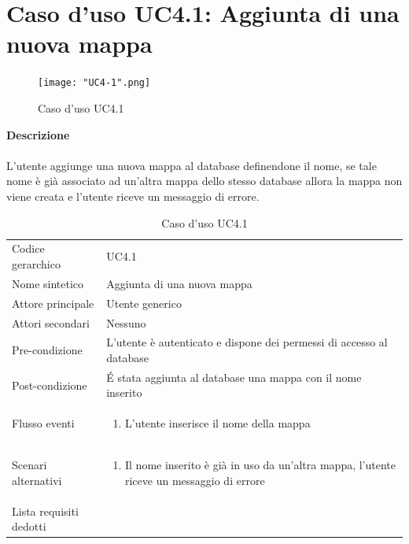 \documentclass[a4paper]{report}
\begin{document}
	 \section{Caso d'uso UC4.1: Aggiunta di una nuova mappa}
	 \begin{figure}[H]
			\centering
			\texttt{[image: "UC4-1".png]}
			\caption{Caso d'uso UC4.1}
		\end{figure}
	 \textbf{Descrizione} \\ \\
	 L'utente aggiunge una nuova mappa al database definendone il nome, se tale nome è già associato ad 
	 un'altra mappa dello stesso database allora la mappa non viene creata e l'utente riceve un messaggio
	 di errore.
		\begin{table}[H]
		\begin{tabularx}{\textwidth}{X | X}\toprule
			\rowcolor{orange!65}Codice gerarchico & UC4.1 \\
			Nome sintetico & Aggiunta di una nuova mappa \\
			\rowcolor{orange!65}Attore principale & Utente generico\\
			Attori secondari & Nessuno \\
			\rowcolor{orange!65}Pre-condizione & L'utente è autenticato e dispone dei permessi di accesso
			al database\\
			Post-condizione & \'E stata aggiunta al database una mappa con il nome inserito\\
			\rowcolor{orange!65}Flusso eventi & \begin{enumerate}
			\item L'utente inserisce il nome della mappa
			\end{enumerate} \\
			Scenari alternativi & \begin{enumerate}
			\item Il nome inserito è già in uso da un'altra mappa, l'utente riceve un messaggio di errore
			\end{enumerate} \\
			\rowcolor{orange!65}Lista requisiti dedotti & \\
			\bottomrule
		\end{tabularx}
		\caption{Caso d'uso UC4.1}
	 \end{table}
\end{document}
